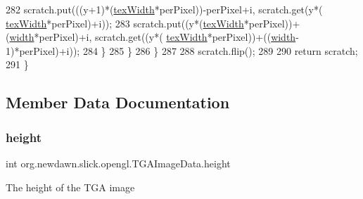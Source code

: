 \begin{DoxyCode}
282                     scratch.put(((y+1)*(\mbox{\hyperlink{classorg_1_1newdawn_1_1slick_1_1opengl_1_1_t_g_a_image_data_a1597fcbecdd0d2875a3950ebe60b2582}{texWidth}}*perPixel))-perPixel+i, scratch.get(y*(
      \mbox{\hyperlink{classorg_1_1newdawn_1_1slick_1_1opengl_1_1_t_g_a_image_data_a1597fcbecdd0d2875a3950ebe60b2582}{texWidth}}*perPixel)+i));
283                     scratch.put((y*(\mbox{\hyperlink{classorg_1_1newdawn_1_1slick_1_1opengl_1_1_t_g_a_image_data_a1597fcbecdd0d2875a3950ebe60b2582}{texWidth}}*perPixel))+(\mbox{\hyperlink{classorg_1_1newdawn_1_1slick_1_1opengl_1_1_t_g_a_image_data_a76539de4fa236043b0f8b31b0ce7c1cf}{width}}*perPixel)+i, scratch.get((y*(
      \mbox{\hyperlink{classorg_1_1newdawn_1_1slick_1_1opengl_1_1_t_g_a_image_data_a1597fcbecdd0d2875a3950ebe60b2582}{texWidth}}*perPixel))+((\mbox{\hyperlink{classorg_1_1newdawn_1_1slick_1_1opengl_1_1_t_g_a_image_data_a76539de4fa236043b0f8b31b0ce7c1cf}{width}}-1)*perPixel)+i));
284                 \}
285             \}
286         \}
287 
288         scratch.flip();
289 
290         \textcolor{keywordflow}{return} scratch;
291     \}
\end{DoxyCode}


\subsection{Member Data Documentation}
\mbox{\label{classorg_1_1newdawn_1_1slick_1_1opengl_1_1_t_g_a_image_data_ae129d18b6db032f7ef0ab8ebc795843b}} 
\subsubsection{\texorpdfstring{height}{height}}
{\footnotesize\ttfamily int org.\+newdawn.\+slick.\+opengl.\+T\+G\+A\+Image\+Data.\+height\hspace{0.3cm}{\ttfamily [private]}}

The height of the T\+GA image \mbox{\label{classorg_1_1newdawn_1_1slick_1_1opengl_1_1_t_g_a_image_data_aa9222304ea8eae0cae78ff6ff0a7f8f2}} 
